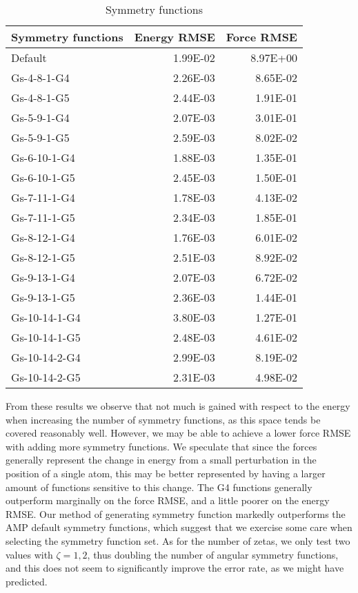 \begin{table}[H]
\centering
\begin{tabular}{lrr}
\toprule
Symmetry functions &  Energy RMSE &  Force RMSE \\
\midrule
          Default &     1.99E-02 &    8.97E+00 \\
      Gs-4-8-1-G4 &     2.26E-03 &    8.65E-02 \\
      Gs-4-8-1-G5 &     2.44E-03 &    1.91E-01 \\
      Gs-5-9-1-G4 &     2.07E-03 &    3.01E-01 \\
      Gs-5-9-1-G5 &     2.59E-03 &    8.02E-02 \\
     Gs-6-10-1-G4 &     1.88E-03 &    1.35E-01 \\
     Gs-6-10-1-G5 &     2.45E-03 &    1.50E-01 \\
     Gs-7-11-1-G4 &     1.78E-03 &    4.13E-02 \\
     Gs-7-11-1-G5 &     2.34E-03 &    1.85E-01 \\
     Gs-8-12-1-G4 &     1.76E-03 &    6.01E-02 \\
     Gs-8-12-1-G5 &     2.51E-03 &    8.92E-02 \\
     Gs-9-13-1-G4 &     2.07E-03 &    6.72E-02 \\
     Gs-9-13-1-G5 &     2.36E-03 &    1.44E-01 \\
    Gs-10-14-1-G4 &     3.80E-03 &    1.27E-01 \\
    Gs-10-14-1-G5 &     2.48E-03 &    4.61E-02 \\
    Gs-10-14-2-G4 &     2.99E-03 &    8.19E-02 \\
    Gs-10-14-2-G5 &     2.31E-03 &    4.98E-02 \\
\bottomrule
\end{tabular}
\caption{Symmetry functions}
\label{table:symmetry}
\end{table}

From these results we observe that not much is gained with respect
to the energy when increasing the number of symmetry functions,
as this space tends be covered reasonably well.
However, we may be able to achieve a lower force RMSE
with adding more symmetry functions. We speculate that 
since the forces generally represent the change in energy
from a small perturbation in the position of a single atom,
this may be better represented by having a larger amount
of functions sensitive to this change. 
The G4 functions generally outperform marginally on the force RMSE,
and a little poorer on the energy RMSE.
Our method of generating symmetry function markedly outperforms
the AMP default symmetry functions, which suggest that we exercise
some care when selecting the symmetry function set.
As for the number of zetas, we only test two values with
$\zeta = 1, 2$, thus doubling the number of angular symmetry functions,
and this does not seem to significantly improve the error rate,
as we might have predicted.

